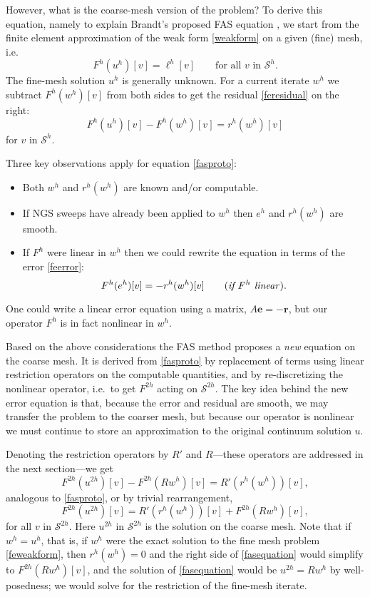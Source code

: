 \documentclass[letterpaper,final,12pt,reqno]{amsart}
\newcommand{\be}{\mathbf{e}}
\newcommand{\br}{\mathbf{r}}
\begin{document}
However, what is the coarse-mesh version of the problem?  To derive this equation, namely to explain Brandt's proposed FAS equation \cite{Brandt1977}, we start from the finite element approximation of the weak form \eqref{weakform} on a given (fine) mesh, i.e.
\begin{equation}
  F^h(u^h)[v] = \ell^h[v] \qquad \text{for all } v \text{ in } \mathcal{S}^h. \label{feweakform}
\end{equation}
The fine-mesh solution $u^h$ is generally unknown.  For a current iterate $w^h$ we subtract $F^h(w^h)[v]$ from both sides to get the residual \eqref{feresidual} on the right:
\begin{equation}
  F^h(u^h)[v] - F^h(w^h)[v] = r^h(w^h)[v] \label{fasproto}
\end{equation}
for $v$ in $\mathcal{S}^h$.

Three key observations apply for equation \eqref{fasproto}:
\begin{itemize}
\item Both $w^h$ and $r^h(w^h)$ are known and/or computable.
\item If NGS sweeps have already been applied to $w^h$ then $e^h$ and $r^h(w^h)$ are smooth.
\item If $F^h$ were linear in $w^h$ then we could rewrite the equation in terms of the error \eqref{feerror}:
    $$F^h(e^h)[v] = -r^h(w^h)[v] \qquad (\text{\emph{if $F^h$ linear}}).$$
\end{itemize}
One could write a linear error equation using a matrix, $A\be=-\br$, but our operator $F^h$ is in fact nonlinear in $w^h$.

Based on the above considerations the FAS method proposes a \emph{new} equation on the coarse mesh.  It is derived from \eqref{fasproto} by replacement of terms using linear restriction operators on the computable quantities, and by re-discretizing the nonlinear operator, i.e.~to get $F^{2h}$ acting on $\mathcal{S}^{2h}$.  The key idea behind the new error equation is that, because the error and residual are smooth, we may transfer the problem to the coarser mesh, but because our operator is nonlinear we must continue to store an approximation to the original continuum solution $u$.

Denoting the restriction operators by $R'$ and $R$---these operators are addressed in the next section---we get
\begin{equation}
  F^{2h}(u^{2h})[v] - F^{2h}(R w^h)[v] = R' (r^h(w^h))[v], \label{faspreequation}
\end{equation}
analogous to \eqref{fasproto}, or by trivial rearrangement,
\begin{equation}
  F^{2h}(u^{2h})[v] = R' (r^h(w^h))[v] + F^{2h}(R w^h)[v], \label{fasequation}
\end{equation}
for all $v$ in $\mathcal{S}^{2h}$.  Here $u^{2h}$ in $\mathcal{S}^{2h}$ is the solution on the coarse mesh.  Note that if $w^h=u^h$, that is, if $w^h$ were the exact solution to the fine mesh problem \eqref{feweakform}, then $r^h(w^h)=0$ and the right side of \eqref{fasequation} would simplify to $F^{2h}(R w^h)[v]$, and the solution of \eqref{fasequation} would be $u^{2h} = R w^h$ by well-posedness; we would solve for the restriction of the fine-mesh iterate.
\end{document}
